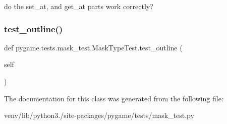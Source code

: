 \begin{DoxyVerb}do the set_at, and get_at parts work correctly?
\end{DoxyVerb}
 \mbox{\label{classpygame_1_1tests_1_1mask__test_1_1_mask_type_test_a511f168691f548401b62928fe747ffb3}} 
\subsubsection{\texorpdfstring{test\+\_\+outline()}{test\_outline()}}
{\footnotesize\ttfamily def pygame.\+tests.\+mask\+\_\+test.\+Mask\+Type\+Test.\+test\+\_\+outline (\begin{DoxyParamCaption}\item[{}]{self }\end{DoxyParamCaption})}

\begin{DoxyVerb}\end{DoxyVerb}
 

The documentation for this class was generated from the following file\+:\begin{DoxyCompactItemize}
\item 
venv/lib/python3./site-\/packages/pygame/tests/mask\+\_\+test.\+py\end{DoxyCompactItemize}

